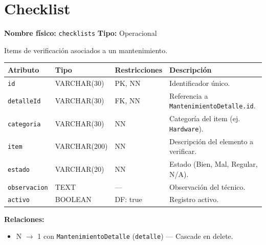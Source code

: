 \documentclass[12pt,a4paper]{article}
\newenvironment{tabladesc}[3]{%
  \section{#1}
  \textbf{Nombre físico:} \texttt{#2} \hfill \textbf{Tipo:} #3\par
  \medskip
}{%
  \bigskip
}
\begin{document}
\begin{tabladesc}{Checklist}{checklists}{Operacional}

Items de verificación asociados a un mantenimiento.

\bigskip
\begin{longtable}{L{3.5cm} L{2.5cm} L{2cm} L{7.5cm}}
\toprule
\textbf{Atributo} & \textbf{Tipo} & \textbf{Restricciones} & \textbf{Descripción} \\
\midrule
\endhead
\bottomrule
\endfoot
\texttt{id}        & VARCHAR(30) & PK, NN & Identificador único. \\
\texttt{detalleId} & VARCHAR(30) & FK, NN & Referencia a \texttt{MantenimientoDetalle.id}. \\
\texttt{categoria} & VARCHAR(30) & NN     & Categoría del item (ej. \texttt{Hardware}). \\
\texttt{item}      & VARCHAR(200)& NN     & Descripción del elemento a verificar. \\
\texttt{estado}    & VARCHAR(20) & NN     & Estado (Bien, Mal, Regular, N/A). \\
\texttt{observacion}& TEXT       & ---    & Observación del técnico. \\
\texttt{activo}    & BOOLEAN     & DF: true & Registro activo. \\
\bottomrule
\end{longtable}

\textbf{Relaciones:}
\begin{itemize}[nosep]
  \item N $\rightarrow$ 1 con \texttt{MantenimientoDetalle} (\texttt{detalle}) — Cascade en delete.
\end{itemize}
\end{tabladesc}
\end{document}
